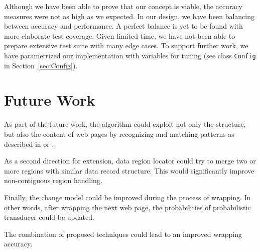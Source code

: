 Although we have been able to prove that our concept is viable, the accuracy measures were not as high as we expected. In our design, we have been balancing between accuracy and performance. A perfect balance is yet to be found with more elaborate test coverage. Given limited time, we have not been able to prepare extensive test suite with many edge cases. To support further work, we have parametrized our implementation with variables for tuning (see class \texttt{Config} in Section~\ref{sec:Config}).


\section{Future Work}
\label{sec:future-work}

As part of the future work, the algorithm could exploit not only the structure, but also the content of web pages by recognizing and matching patterns as described in \cite{lerman2003a} or \cite{Chidlovskii:2006:DES:1142473.1142555}.

As a second direction for extension, data region locator could try to merge two or more regions with similar data record structure. This would significantly improve non-contiguous region handling.

Finally, the change model could be improved during the process of wrapping. In other words, after wrapping the next web page, the probabilities of probabilistic transducer could be updated.

The combination of proposed techniques could lead to an improved wrapping accuracy.


